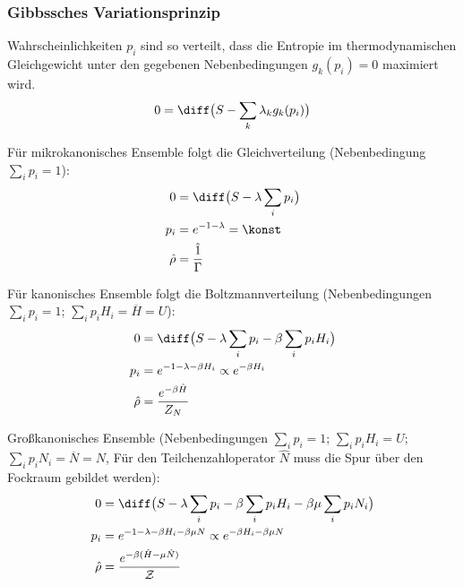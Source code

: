 \documentclass[11pt]{article}
\numberwithin{equation}{section}
\begin{document}
        \subsubsection{Gibbssches Variationsprinzip}
          Wahrscheinlichkeiten $p_i$ sind so verteilt, dass die Entropie im thermodynamischen Gleichgewicht unter den gegebenen Nebenbedingungen $g_k(p_i) = 0$ maximiert wird.
          \begin{equation}
            0 = \diff \big( S - \sum_k \lambda_k g_k(p_i) \big)
          \end{equation}

          Für mikrokanonisches Ensemble folgt die Gleichverteilung (Nebenbedingung $\sum_i p_i = 1$):
          \begin{equation}
            \begin{aligned}
              0 &= \diff \big( S - \lambda \sum_i p_i \big) \\
              p_i &= e^{-1-\lambda} = \konst \\
              \hat{\rho} &= \frac{\hat{1}}{\Gamma} \\ %
            \end{aligned}
          \end{equation}

          Für kanonisches Ensemble folgt die Boltzmannverteilung (Nebenbedingungen $\sum_i p_i = 1$; $\sum_i p_i H_i = \overline{H} = U$):
          \begin{equation}
            \begin{aligned}
              0 &= \diff \big( S - \lambda \sum_i p_i - \beta \sum_i p_i H_i \big) \\
              p_i &= e^{-1-\lambda-\beta H_i} \propto e^{-\beta H_i} \\
              \hat{\rho} &= \frac{e^{-\beta \hat{H}}}{Z_N} \\
            \end{aligned}
          \end{equation}

          Großkanonisches Ensemble (Nebenbedingungen $\sum_i p_i = 1$; $\sum_i p_i H_i = U$; $\sum_i p_i N_i = \overline{N} = N$, Für den Teilchenzahloperator $\hat{N}$ muss die Spur über den Fockraum gebildet werden):
          \begin{equation}
            \begin{aligned}
              0 &= \diff \big( S - \lambda \sum_i p_i - \beta \sum_i p_i H_i - \beta\mu \sum_i p_i N_i \big) \\
              p_i &= e^{-1-\lambda-\beta H_i-\beta\mu N} \propto e^{-\beta H_i - \beta\mu N} \\
              \hat{\rho} &= \frac{e^{-\beta (\hat{H} - \mu \hat{N})}}{\mathcal{Z}} \\
            \end{aligned}
          \end{equation}
\end{document}

